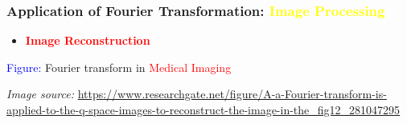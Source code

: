 \documentclass[aspectratio=1610]{beamer}
\begin{document}
  \begin{frame}
    \frametitle{Application of Fourier Transformation: \textcolor{yellow}{Image Processing}}
    \begin{itemize} [label=$\star$, itemsep=4pt, parsep=0pt, topsep=10pt]
        \item<1-> \textbf{\textcolor{red}{Image Reconstruction}}
    \end{itemize}
    \vspace{5pt}
    \hspace{20pt}
     \begin{center}
       \scriptsize \textcolor{blue}{Figure:} Fourier transform in \textcolor{red}{Medical Imaging}
    \end{center}
    \vfill 
    \tiny \textit{Image source:}
    \url{https://www.researchgate.net/figure/A-a-Fourier-transform-is-applied-to-the-q-space-images-to-reconstruct-the-image-in-the_fig12_281047295}
  \end{frame}
  
\end{document}
